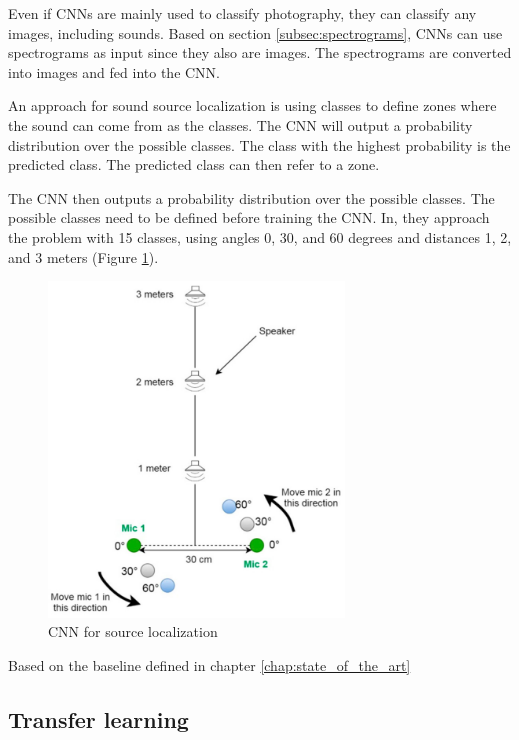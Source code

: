 Even if CNNs are mainly used to classify photography, they can classify any images, including sounds\cite{Grumiaux_2022}. Based on section \ref*{subsec:spectrograms}, CNNs can use spectrograms as input since they also are images. The spectrograms are converted into images and fed into the CNN. 

An approach for sound source localization is using classes to define zones where the sound can come from as the classes. The CNN will output a probability distribution over the possible classes. The class with the highest probability is the predicted class. The predicted class can then refer to a zone.

The CNN then outputs a probability distribution over the possible classes. The possible classes need to be defined before training the CNN. In\cite{s20010172}, they approach the problem with 15 classes, using angles 0, 30, and 60 degrees and distances 1, 2, and 3 meters (Figure \ref*{fig:Yiwere_classes}).

\begin{figure}[H]
    \centering
    \includegraphics[width=0.7\textwidth]{../Images/Yiwere_classes.png}
    \caption{CNN for source localization}
    \label{fig:Yiwere_classes}
\end{figure}

Based on the baseline defined in chapter \ref*{chap:state_of_the_art}



\subsection{Transfer learning}

